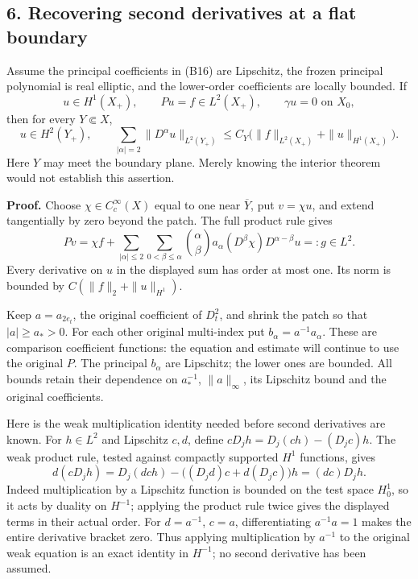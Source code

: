 \documentclass[
  11pt,
]{article}
\begin{document}
\subsection{6. Recovering second derivatives at a flat
boundary}\label{recovering-second-derivatives-at-a-flat-boundary}

Assume the principal coefficients in (B16) are Lipschitz, the frozen
principal polynomial is real elliptic, and the lower-order coefficients
are locally bounded. If \[
 u\in H^1(X_+),\qquad Pu=f\in L^2(X_+),\qquad\gamma u=0\text{ on }X_0, \tag{B21}
\] then for every \(Y\Subset X\), \[
 u\in H^2(Y_+),\qquad
 \sum_{|\alpha|=2}\|D^\alpha u\|_{L^2(Y_+)}
 \leq C_Y\bigl(\|f\|_{L^2(X_+)}+\|u\|_{H^1(X_+)}\bigr). \tag{B22}
\] Here \(Y\) may meet the boundary plane. Merely knowing the interior
theorem would not establish this assertion.

\textbf{Proof.} Choose \(\chi\in C_c^\infty(X)\) equal to one near
\(\overline Y\), put \(v=\chi u\), and extend tangentially by zero
beyond the patch. The full product rule gives \[
 Pv=\chi f+
 \sum_{|\alpha|\leq2}\sum_{0<\beta\leq\alpha}
 \binom\alpha\beta a_\alpha(D^\beta\chi)D^{\alpha-\beta}u
 =:g\in L^2.
 \tag{BO1}
\] Every derivative on \(u\) in the displayed sum has order at most one.
Its norm is bounded by \(C(\|f\|_2+\|u\|_{H^1})\).

Keep \(a=a_{2e_t}\), the original coefficient of \(D_t^2\), and shrink
the patch so that \(|a|\geq a_*>0\). For each other original multi-index
put \(b_\alpha=a^{-1}a_\alpha\). These are comparison coefficient
functions: the equation and estimate will continue to use the original
\(P\). The principal \(b_\alpha\) are Lipschitz; the lower ones are
bounded. All bounds retain their dependence on \(a_*^{-1}\),
\(\|a\|_\infty\), its Lipschitz bound and the original coefficients.

Here is the weak multiplication identity needed before second
derivatives are known. For \(h\in L^2\) and Lipschitz \(c,d\), define
\(cD_jh=D_j(ch)-(D_jc)h\). The weak product rule, tested against
compactly supported \(H^1\) functions, gives \[
 d(cD_jh)=D_j(dch)-\big((D_jd)c+d(D_jc)\big)h
          =(dc)D_jh.
 \tag{BO2}
\] Indeed multiplication by a Lipschitz function is bounded on the test
space \(H^1_0\), so it acts by duality on \(H^{-1}\); applying the
product rule twice gives the displayed terms in their actual order. For
\(d=a^{-1}\), \(c=a\), differentiating \(a^{-1}a=1\) makes the entire
derivative bracket zero. Thus applying multiplication by \(a^{-1}\) to
the original weak equation is an exact identity in \(H^{-1}\); no second
derivative has been assumed.
\end{document}
